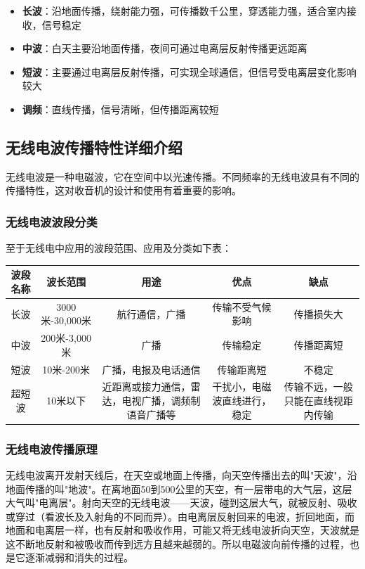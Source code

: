 \documentclass[12pt,UTF8]{ctexbook}
\begin{document}
\begin{itemize}[leftmargin=3.5em]
    \item \textbf{长波}：沿地面传播，绕射能力强，可传播数千公里，穿透能力强，适合室内接收，信号稳定
    \item \textbf{中波}：白天主要沿地面传播，夜间可通过电离层反射传播更远距离
    \item \textbf{短波}：主要通过电离层反射传播，可实现全球通信，但信号受电离层变化影响较大
    \item \textbf{调频}：直线传播，信号清晰，但传播距离较短
\end{itemize}

\subsection{无线电波传播特性详细介绍}

无线电波是一种电磁波，它在空间中以光速传播。不同频率的无线电波具有不同的传播特性，这对收音机的设计和使用有着重要的影响。

\subsubsection{无线电波波段分类}

至于无线电中应用的波段范围、应用及分类如下表：

\begin{tabular}{|c|c|c|c|c|}
\hline
\textbf{波段名称} & \textbf{波长范围} & \textbf{用途} & \textbf{优点} & \textbf{缺点} \\
\hline
长波 & 3000米-30,000米 & 航行通信，广播 & 传输不受气候影响 & 传播损失大 \\
\hline
中波 & 200米-3,000米 & 广播 & 传输稳定 & 传播距离短 \\
\hline
短波 & 10米-200米 & 广播，电报及电话通信 & 传输距离短 & 不稳定 \\
\hline
超短波 & 10米以下 & 近距离或接力通信，雷达，电视广播，调频制语音广播等 & 干扰小，电磁波直线进行，稳定 & 传输不远，一般只能在直线视距内传输 \\
\hline
\end{tabular}

\subsubsection{无线电波传播原理}

无线电波离开发射天线后，在天空或地面上传播，向天空传播出去的叫"天波"，沿地面传播的叫"地波"。在离地面50到500公里的天空，有一层带电的大气层，这层大气叫"电离层"。射向天空的无线电波——天波，碰到这层大气，就被反射、吸收或穿过（看波长及入射角的不同而异）。由电离层反射回来的电波，折回地面，而地面和电离层一样，也有反射和吸收作用，可能又将无线电波折向天空，天波就是这不断地反射和被吸收而传到远方且越来越弱的。所以电磁波向前传播的过程，也是它逐渐减弱和消失的过程。
\end{document}
